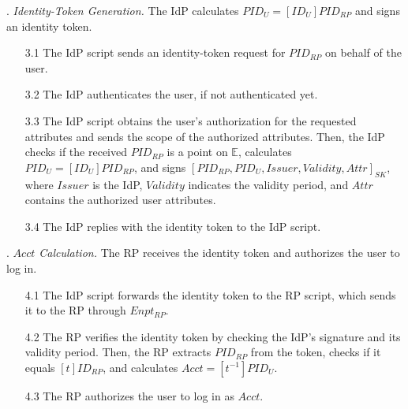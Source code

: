 . {\em Identity-Token Generation.}
The IdP calculates $PID_U = [ID_U]{PID_{RP}}$ and signs an identity token. %
\vspace{-\topsep}
\begin{itemize}
\setlength{\topsep}{0pt}
\setlength{\partopsep}{0pt}
\setlength{\itemsep}{0pt}
\setlength{\parsep}{0pt}
\setlength{\parskip}{0pt}
\item[3.1]
The IdP script sends an identity-token request for $PID_{RP}$ on behalf of the user. %

\item[3.2] The IdP authenticates the user, if not authenticated yet.

\item [3.3]
The IdP script obtains the user's authorization for the requested attributes and sends the scope of the authorized attributes.
\newc
Then, the IdP checks if the received $PID_{RP}$ is a point on $\mathbb{E}$,
\oldc
calculates $PID_U = [ID_U]{PID_{RP}}$, and signs $[PID_{RP}, PID_U, Issuer, Validity, Attr]_{SK}$, where $Issuer$ is the IdP, $Validity$ indicates the validity period, and $Attr$ contains the authorized user attributes.
\item[3.4] The IdP replies with the identity token to the IdP script.
\end{itemize}

. {\em $Acct$ Calculation.}
The RP receives the identity token and authorizes the user to log in.
\vspace{-\topsep}
\begin{itemize}
\setlength{\topsep}{0pt}
\setlength{\partopsep}{0pt}
\setlength{\itemsep}{0pt}
\setlength{\parsep}{0pt}
\setlength{\parskip}{0pt}
\item [4.1]
The IdP script forwards the identity token to the RP script,
    which sends it to the RP through $Enpt_{RP}$.
\item[4.2] The RP verifies the identity token by checking the IdP's signature and its validity period.
Then, \newc
the RP extracts $PID_{RP}$ from the token, checks if it equals $[t]ID_{RP}$,
\oldc
and calculates $Acct = [t^{-1}]{PID_U}$.

\item [4.3] The RP authorizes the user to log in as $Acct$.

\end{itemize}



